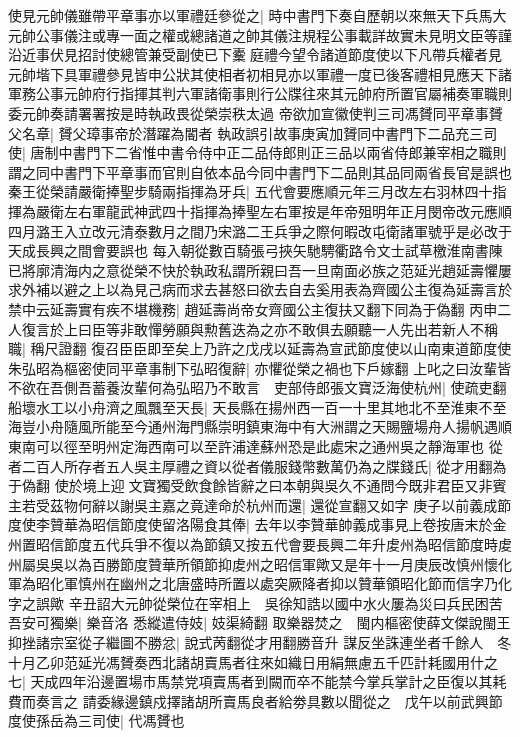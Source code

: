 使見元帥儀雖帶平章事亦以軍禮廷參從之|{
	時中書門下奏自歷朝以來無天下兵馬大元帥公事儀注或專一面之權或總諸道之帥其儀注規程公事載詳故實未見明文臣等謹沿近事伏見招討使總管兼受副使已下櫜庭禮今望令諸道節度使以下凡帶兵權者見元帥堦下具軍禮參見皆申公狀其使相者初相見亦以軍禮一度已後客禮相見應天下諸軍務公事元帥府行指揮其判六軍諸衛事則行公牒往來其元帥府所置官屬補奏軍職則委元帥奏請署署按是時執政畏從榮崇秩太過}
帝欲加宣徽使判三司馮贇同平章事贇父名章|{
	贇父璋事帝於潛躍為閽者}
執政誤引故事庚寅加贇同中書門下二品充三司使|{
	唐制中書門下二省惟中書令侍中正二品侍郎則正三品以兩省侍郎兼宰相之職則謂之同中書門下平章事而官則自依本品今同中書門下二品則其品同兩省長官是誤也}
秦王從榮請嚴衛捧聖步騎兩指揮為牙兵|{
	五代會要應順元年三月改左右羽林四十指揮為嚴衛左右軍龍武神武四十指揮為捧聖左右軍按是年帝殂明年正月閔帝改元應順四月潞王入立改元清泰數月之間乃宋潞二王兵爭之際何暇改屯衛諸軍號乎是必改于天成長興之間會要誤也}
每入朝從數百騎張弓挾矢馳騁衢路令文士試草檄淮南書陳已將廓清海内之意從榮不快於執政私謂所親曰吾一旦南面必族之范延光趙延壽懼屢求外補以避之上以為見己病而求去甚怒曰欲去自去奚用表為齊國公主復為延壽言於禁中云延壽實有疾不堪機務|{
	趙延壽尚帝女齊國公主復扶又翻下同為于偽翻}
丙申二人復言於上曰臣等非敢憚勞願與勲舊迭為之亦不敢俱去願聽一人先出若新人不稱職|{
	稱尺證翻}
復召臣臣即至矣上乃許之戊戌以延壽為宣武節度使以山南東道節度使朱弘昭為樞密使同平章事制下弘昭復辭|{
	亦懼從榮之禍也下戶嫁翻}
上叱之曰汝輩皆不欲在吾側吾蓄養汝輩何為弘昭乃不敢言　吏部侍郎張文寶泛海使杭州|{
	使疏吏翻}
船壞水工以小舟濟之風飄至天長|{
	天長縣在揚州西一百一十里其地北不至淮東不至海豈小舟隨風所能至今通州海門縣崇明鎮東海中有大洲謂之天賜鹽場舟人揚帆遇順東南可以徑至明州定海西南可以至許浦達蘇州恐是此處宋之通州吳之靜海軍也}
從者二百人所存者五人吳主厚禮之資以從者儀服錢幣數萬仍為之牒錢氏|{
	從才用翻為于偽翻}
使於境上迎文寶獨受飲食餘皆辭之曰本朝與吳久不通問今既非君臣又非賓主若受茲物何辭以謝吳主嘉之竟達命於杭州而還|{
	還從宣翻又如字}
庚子以前義成節度使李贊華為昭信節度使留洛陽食其俸|{
	去年以李贊華帥義成事見上卷按唐末於金州置昭信節度五代兵爭不復以為節鎮又按五代會要長興二年升䖍州為昭信節度時䖍州屬吳吳以為百勝節度贊華所領節抑䖍州之昭信軍歟又是年十一月庚辰改慎州懷化軍為昭化軍慎州在幽州之北唐盛時所置以處突厥降者抑以贊華領昭化節而信字乃化字之誤歟}
辛丑詔大元帥從榮位在宰相上　吳徐知誥以國中水火屢為災曰兵民困苦吾安可獨樂|{
	樂音洛}
悉縱遣侍妓|{
	妓渠綺翻}
取樂器焚之　閩内樞密使薛文傑說閩王抑挫諸宗室從子繼圖不勝忿|{
	說式苪翻從才用翻勝音升}
謀反坐誅連坐者千餘人　冬十月乙卯范延光馮贇奏西北諸胡賣馬者往來如織日用絹無慮五千匹計耗國用什之七|{
	天成四年沿邊置場市馬禁党項賣馬者到闕而卒不能禁今掌兵掌計之臣復以其耗費而奏言之}
請委緣邊鎮戍擇諸胡所賣馬良者給劵具數以聞從之　戊午以前武興節度使孫岳為三司使|{
	代馮贇也}
